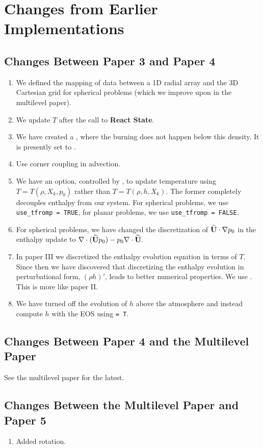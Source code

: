 \section{Changes from Earlier Implementations}
\subsection{Changes Between Paper 3 and Paper 4}
\begin{enumerate}
\item We defined the mapping of data between a 1D radial array and the 3D Cartesian
grid for spherical problems (which we improve upon in the multilevel paper).
\item We update $T$ after the call to {\bf React State}.
\item We have created a , where the burning does
not happen below this density.  It is presently set to .
\item Use corner coupling in advection.
\item We have an option, controlled by , to update temperature 
using $T=T(\rho,X_k,p_0)$ rather than $T=T(\rho,h,X_k)$.  The former completely 
decouples enthalpy from our system.  For spherical problems, we use 
{\tt use\_tfromp = TRUE}, for planar problems, we use {\tt use\_tfromp = FALSE}.
\item For spherical problems, we have changed the discretization of 
$\widetilde{{\bf U}}\cdot\nabla p_0$ in the enthalpy update to 
$\nabla\cdot(\widetilde{{\bf U}} p_0) - p_0\nabla\cdot\widetilde{{\bf U}}$.
\item In paper III we discretized the enthalpy evolution equation in
terms of $T$.  Since then we have discovered that 
discretizing the enthalpy evolution in perturbational form, $(\rho h)'$,
leads to better numerical properties.  We use .
This is more like paper II.
\item We have turned off the evolution of $h$ above the atmosphere and instead
compute $h$ with the EOS using  {\tt = T}.
\end{enumerate}


\subsection{Changes Between Paper 4 and the Multilevel Paper}
See the multilevel paper for the latest.


\subsection{Changes Between the Multilevel Paper and Paper 5~\cite{wdconvect}}
\begin{enumerate}
\item Added rotation.
\end{enumerate}


